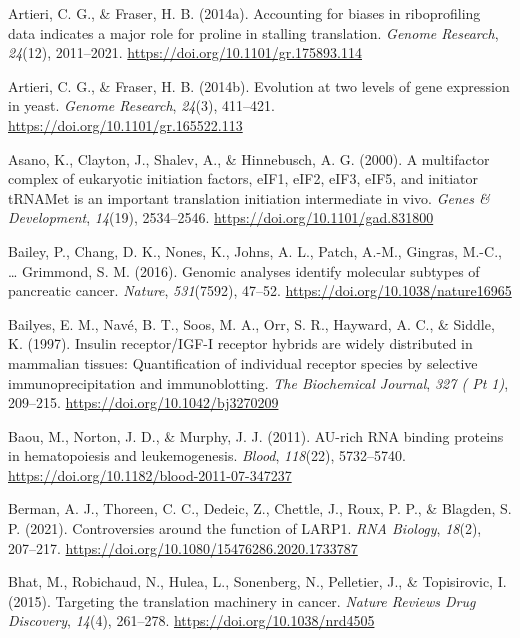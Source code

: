 \documentclass[12pt,openany]{book}
\begin{document}
\hypertarget{ref-Artieri2014a}{}
Artieri, C. G., \& Fraser, H. B. (2014a). Accounting for biases in
riboprofiling data indicates a major role for proline in stalling
translation. \emph{Genome Research}, \emph{24}(12), 2011--2021.
\url{https://doi.org/10.1101/gr.175893.114}

\hypertarget{ref-Artieri2014}{}
Artieri, C. G., \& Fraser, H. B. (2014b). Evolution at two levels of
gene expression in yeast. \emph{Genome Research}, \emph{24}(3),
411--421. \url{https://doi.org/10.1101/gr.165522.113}

\hypertarget{ref-Asano2000}{}
Asano, K., Clayton, J., Shalev, A., \& Hinnebusch, A. G. (2000). A
multifactor complex of eukaryotic initiation factors, eIF1, eIF2, eIF3,
eIF5, and initiator tRNAMet is an important translation initiation
intermediate in vivo. \emph{Genes \& Development}, \emph{14}(19),
2534--2546. \url{https://doi.org/10.1101/gad.831800}

\hypertarget{ref-Bailey2016}{}
Bailey, P., Chang, D. K., Nones, K., Johns, A. L., Patch, A.-M.,
Gingras, M.-C., \ldots{} Grimmond, S. M. (2016). Genomic analyses
identify molecular subtypes of pancreatic cancer. \emph{Nature},
\emph{531}(7592), 47--52. \url{https://doi.org/10.1038/nature16965}

\hypertarget{ref-Bailyes1997}{}
Bailyes, E. M., Navé, B. T., Soos, M. A., Orr, S. R., Hayward, A. C., \&
Siddle, K. (1997). Insulin receptor/IGF-I receptor hybrids are widely
distributed in mammalian tissues: Quantification of individual receptor
species by selective immunoprecipitation and immunoblotting. \emph{The
Biochemical Journal}, \emph{327 ( Pt 1)}, 209--215.
\url{https://doi.org/10.1042/bj3270209}

\hypertarget{ref-Baou2011}{}
Baou, M., Norton, J. D., \& Murphy, J. J. (2011). AU-rich RNA binding
proteins in hematopoiesis and leukemogenesis. \emph{Blood},
\emph{118}(22), 5732--5740.
\url{https://doi.org/10.1182/blood-2011-07-347237}

\hypertarget{ref-Berman2021}{}
Berman, A. J., Thoreen, C. C., Dedeic, Z., Chettle, J., Roux, P. P., \&
Blagden, S. P. (2021). Controversies around the function of LARP1.
\emph{RNA Biology}, \emph{18}(2), 207--217.
\url{https://doi.org/10.1080/15476286.2020.1733787}

\hypertarget{ref-Bhat2015}{}
Bhat, M., Robichaud, N., Hulea, L., Sonenberg, N., Pelletier, J., \&
Topisirovic, I. (2015). Targeting the translation machinery in cancer.
\emph{Nature Reviews Drug Discovery}, \emph{14}(4), 261--278.
\url{https://doi.org/10.1038/nrd4505}
\end{document}

